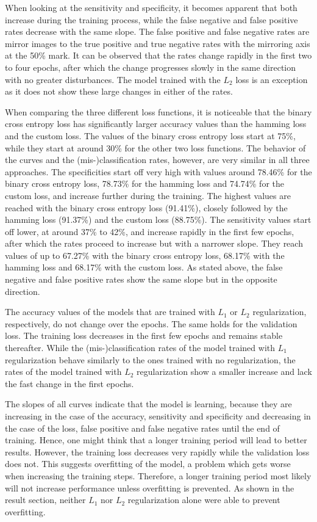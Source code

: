 When looking at the sensitivity and specificity, it becomes apparent that both increase during the training process, while the false negative and false positive rates decrease with the same slope. The false positive and false negative rates are mirror images to the true positive and true negative rates with the mirroring axis at the 50\% mark. It can be observed that the rates change rapidly in the first two to four epochs, after which the change progresses slowly in the same direction with no greater disturbances. The model trained with the \(L_2\) loss is an exception as it does not show these large changes in either of the rates.

\bigskip
When comparing the three different loss functions, it is noticeable that the binary cross entropy loss has significantly larger accuracy values than the hamming loss and the custom loss. The values of the binary cross entropy loss start at 75\%, while they start at around 30\% for the other two loss functions. The behavior of the curves and the (mis-)classification rates, however, are very similar in all three approaches. The specificities start off very high with values around 78.46\% for the binary cross entropy loss, 78.73\% for the hamming loss and 74.74\% for the custom loss, and increase further during the training. The highest values are reached with the binary cross entropy loss (91.41\%), closely followed by the hamming loss (91.37\%) and the custom loss (88.75\%). The sensitivity values start off lower, at around 37\% to 42\%, and increase rapidly in the first few epochs, after which the rates proceed to increase but with a narrower slope. They reach values of up to 67.27\% with the binary cross entropy loss, 68.17\% with the hamming loss and 68.17\% with the custom loss. As stated above, the false negative and false positive rates show the same slope but in the opposite direction.

The accuracy values of the models that are trained with \(L_1\) or \(L_2\) regularization, respectively, do not change over the epochs. The same holds for the validation loss. The training loss decreases in the first few epochs and remains stable thereafter.
While the (mis-)classification rates of the model trained with \(L_1\) regularization behave similarly to the ones trained with no regularization, the rates of the model trained with \(L_2\) regularization show a smaller increase and lack the fast change in the first epochs.

The slopes of all curves indicate that the model is learning, because they are increasing in the case of the accuracy, sensitivity and specificity and decreasing in the case of the loss, false positive and false negative rates until the end of training. Hence, one might think that a longer training period will lead to better results. However, the training loss decreases very rapidly while the validation loss does not. This suggests overfitting of the model, a problem which gets worse when increasing the training steps. Therefore, a longer training period most likely will not increase performance unless overfitting is prevented. As shown in the result section, neither \(L_1\) nor \(L_2\) regularization alone were able to prevent overfitting.

